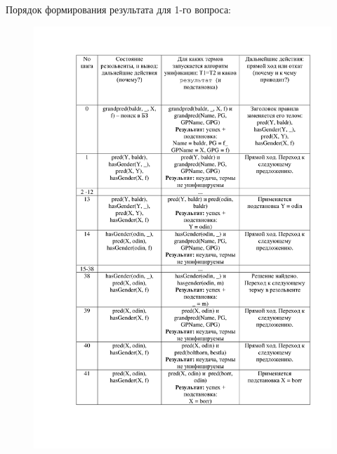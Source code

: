 \documentclass[12pt]{report}
\begin{document}
Порядок формирования результата для 1-го вопроса:

\begin{figure}[H]
	\centering
	\includegraphics[scale=0.32]{0.png}
	\label{fig:1}
\end{figure}
\end{document}
